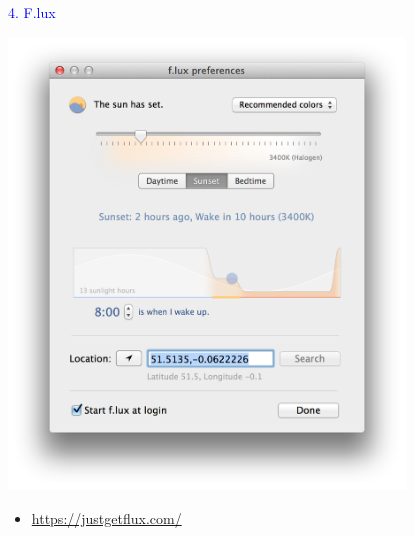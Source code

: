 \documentclass[landscape]{slides}
\begin{document}
\begin{slide}

    \textcolor{blue}{\Large{4. F.lux}}

    \begin{center}
        \includegraphics[height=12cm]{flux}
    \end{center}

    \begin{itemize}
        \item \url{https://justgetflux.com/}
    \end{itemize}

\end{slide}
\end{document}
